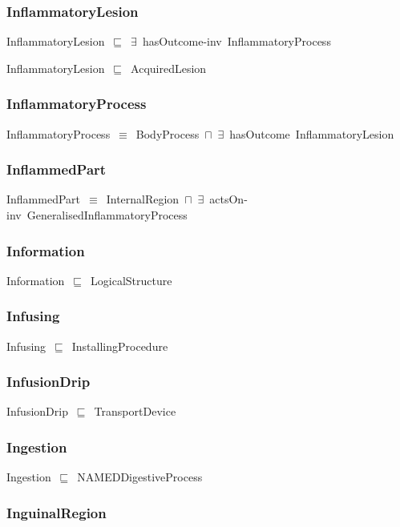 \documentclass{article}
\begin{document}
\subsubsection*{InflammatoryLesion}

InflammatoryLesion~\ensuremath{\sqsubseteq}~\ensuremath{\exists}~hasOutcome-inv~InflammatoryProcess~

InflammatoryLesion~\ensuremath{\sqsubseteq}~AcquiredLesion~

\subsubsection*{InflammatoryProcess}

InflammatoryProcess~\ensuremath{\equiv}~BodyProcess~\ensuremath{\sqcap}~\ensuremath{\exists}~hasOutcome~InflammatoryLesion

\subsubsection*{InflammedPart}

InflammedPart~\ensuremath{\equiv}~InternalRegion~\ensuremath{\sqcap}~\ensuremath{\exists}~actsOn-inv~GeneralisedInflammatoryProcess

\subsubsection*{Information}

Information~\ensuremath{\sqsubseteq}~LogicalStructure~

\subsubsection*{Infusing}

Infusing~\ensuremath{\sqsubseteq}~InstallingProcedure~

\subsubsection*{InfusionDrip}

InfusionDrip~\ensuremath{\sqsubseteq}~TransportDevice~

\subsubsection*{Ingestion}

Ingestion~\ensuremath{\sqsubseteq}~NAMEDDigestiveProcess~

\subsubsection*{InguinalRegion}
\end{document}
